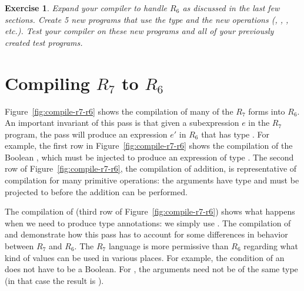 \documentclass[11pt]{book}
\newtheorem{exercise}[theorem]{Exercise}
\begin{document}
\begin{exercise}\normalfont
Expand your compiler to handle $R_6$ as discussed in the last few
sections.  Create 5 new programs that use the  type and the
new operations (, , ,
etc.). Test your compiler on these new programs and all of your
previously created test programs.
\end{exercise}

\section{Compiling $R_7$ to $R_6$}
\label{sec:compile-r7}

Figure~\ref{fig:compile-r7-r6} shows the compilation of many of the
$R_7$ forms into $R_6$. An important invariant of this pass is that
given a subexpression $e$ in the $R_7$ program, the pass will produce
an expression $e'$ in $R_6$ that has type . For example, the
first row in Figure~\ref{fig:compile-r7-r6} shows the compilation of
the Boolean , which must be injected to produce an
expression of type .
%
The second row of Figure~\ref{fig:compile-r7-r6}, the compilation of
addition, is representative of compilation for many primitive
operations: the arguments have type  and must be projected to
 before the addition can be performed.

The compilation of  (third row of
Figure~\ref{fig:compile-r7-r6}) shows what happens when we need to
produce type annotations: we simply use .
%
The compilation of  and   demonstrate how this pass
has to account for some differences in behavior between $R_7$ and
$R_6$. The $R_7$ language is more permissive than $R_6$ regarding what
kind of values can be used in various places. For example, the
condition of an  does not have to be a Boolean. For ,
the arguments need not be of the same type (in that case the
result is ).
\end{document}
